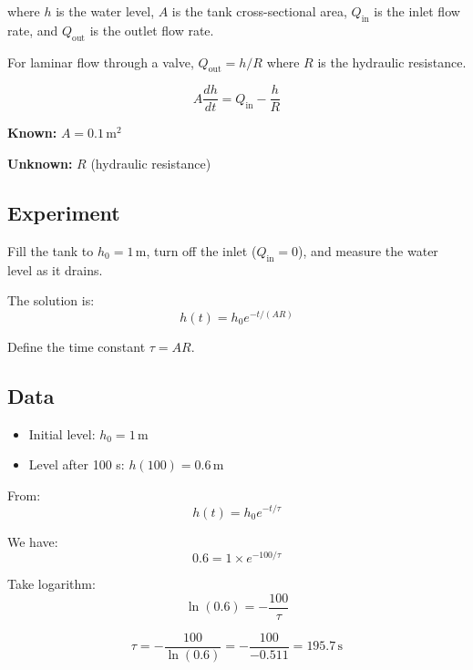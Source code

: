 where $h$ is the water level, $A$ is the tank cross-sectional area, $Q_{\text{in}}$ is the inlet flow rate, and $Q_{\text{out}}$ is the outlet flow rate.

For laminar flow through a valve, $Q_{\text{out}} = h/R$ where $R$ is the hydraulic resistance.

\begin{equation}
A\frac{dh}{dt} = Q_{\text{in}} - \frac{h}{R}
\end{equation}

\textbf{Known:} $A = 0.1 \, \text{m}^2$

\textbf{Unknown:} $R$ (hydraulic resistance)

\subsection{Experiment}

Fill the tank to $h_0 = 1 \, \text{m}$, turn off the inlet ($Q_{\text{in}} = 0$), and measure the water level as it drains.

The solution is:
\begin{equation}
h(t) = h_0 e^{-t/(AR)}
\end{equation}

Define the time constant $\tau = AR$.

\subsection{Data}

\begin{itemize}
    \item Initial level: $h_0 = 1 \, \text{m}$
    \item Level after 100 s: $h(100) = 0.6 \, \text{m}$
\end{itemize}

From:
\begin{equation}
h(t) = h_0 e^{-t/\tau}
\end{equation}

We have:
\begin{equation}
0.6 = 1 \times e^{-100/\tau}
\end{equation}

Take logarithm:
\begin{equation}
\ln(0.6) = -\frac{100}{\tau}
\end{equation}

\begin{equation}
\tau = -\frac{100}{\ln(0.6)} = -\frac{100}{-0.511} = 195.7 \, \text{s}
\end{equation}


